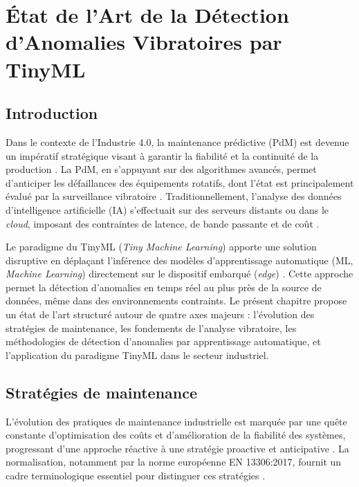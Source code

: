\chapter[État de l'Art]{État de l'Art de la Détection d'Anomalies Vibratoires par TinyML}
\label{chap:etat_art}
\thispagestyle{plain}

\section{Introduction}
\label{sec:intro_etat_art}

Dans le contexte de l'Industrie 4.0, la maintenance prédictive (PdM) est devenue un impératif stratégique visant à garantir la fiabilité et la continuité de la production \cite{hector2024,achouch2022}. La PdM, en s'appuyant sur des algorithmes avancés, permet d'anticiper les défaillances des équipements rotatifs, dont l'état est principalement évalué par la surveillance vibratoire \cite{ran2019}. Traditionnellement, l'analyse des données d'intelligence artificielle (IA) s'effectuait sur des serveurs distants ou dans le \textit{cloud}, imposant des contraintes de latence, de bande passante et de coût \cite{njor2024}.

Le paradigme du TinyML (\textit{Tiny Machine Learning}) apporte une solution disruptive en déplaçant l'inférence des modèles d'apprentissage automatique (ML, \textit{Machine Learning}) directement sur le dispositif embarqué (\textit{edge}) \cite{tsoukas2024}. Cette approche permet la détection d'anomalies en temps réel au plus près de la source de données, même dans des environnements contraints. Le présent chapitre propose un état de l'art structuré autour de quatre axes majeurs : l'évolution des stratégies de maintenance, les fondements de l'analyse vibratoire, les méthodologies de détection d'anomalies par apprentissage automatique, et l'application du paradigme TinyML dans le secteur industriel.

\section{Stratégies de maintenance}
\label{sec:strategies_maintenance}

L'évolution des pratiques de maintenance industrielle est marquée par une quête constante d'optimisation des coûts et d'amélioration de la fiabilité des systèmes, progressant d'une approche réactive à une stratégie proactive et anticipative \cite{ran2019}. La normalisation, notamment par la norme européenne EN 13306:2017, fournit un cadre terminologique essentiel pour distinguer ces stratégies \cite{en13306}.

